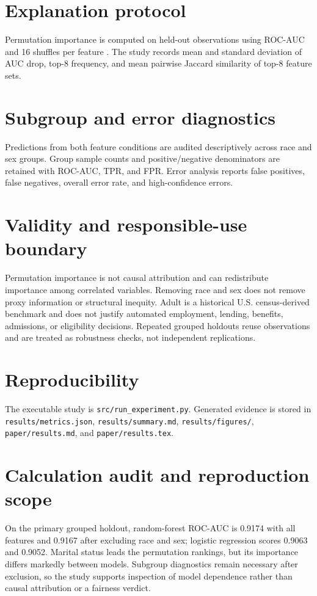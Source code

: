\documentclass[11pt]{article}
\begin{document}
\section{Explanation protocol}
Permutation importance is computed on held-out observations using ROC-AUC and 16 shuffles per feature \cite{breiman2001rf,fisher2019model}. The study records mean and standard deviation of AUC drop, top-8 frequency, and mean pairwise Jaccard similarity of top-8 feature sets.

\section{Subgroup and error diagnostics}
Predictions from both feature conditions are audited descriptively across race and sex groups. Group sample counts and positive/negative denominators are retained with ROC-AUC, TPR, and FPR. Error analysis reports false positives, false negatives, overall error rate, and high-confidence errors.



\section{Validity and responsible-use boundary}
Permutation importance is not causal attribution and can redistribute importance among correlated variables. Removing race and sex does not remove proxy information or structural inequity. Adult is a historical U.S. census-derived benchmark and does not justify automated employment, lending, benefits, admissions, or eligibility decisions. Repeated grouped holdouts reuse observations and are treated as robustness checks, not independent replications.

\section{Reproducibility}
The executable study is \texttt{src/run\_experiment.py}. Generated evidence is stored in \texttt{results/metrics.json}, \texttt{results/summary.md}, \texttt{results/figures/}, \texttt{paper/results.md}, and \texttt{paper/results.tex}.



\section{Calculation audit and reproduction scope}
On the primary grouped holdout, random-forest ROC-AUC is 0.9174 with all features and 0.9167 after excluding race and sex; logistic regression scores 0.9063 and 0.9052. Marital status leads the permutation rankings, but its importance differs markedly between models. Subgroup diagnostics remain necessary after exclusion, so the study supports inspection of model dependence rather than causal attribution or a fairness verdict.
\end{document}
